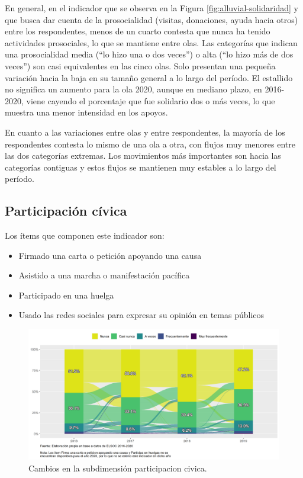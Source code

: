 \documentclass[
  12pt,
]{book}
\begin{document}
En general, en el indicador que se observa en la Figura \ref{fig:alluvial-solidaridad} y que busca dar cuenta de la prosocialidad (visitas, donaciones, ayuda hacia otros) entre los respondentes, menos de un cuarto contesta que nunca ha tenido actividades prosociales, lo que se mantiene entre olas. Las categorías que indican una prosocialidad media (``lo hizo una o dos veces'') o alta (``lo hizo más de dos veces'') son casi equivalentes en las cinco olas. Solo presentan una pequeña variación hacia la baja en su tamaño general a lo largo del período. El estallido no significa un aumento para la ola 2020, aunque en mediano plazo, en 2016-2020, viene cayendo el porcentaje que fue solidario dos o más veces, lo que muestra una menor intensidad en los apoyos.

En cuanto a las variaciones entre olas y entre respondentes, la mayoría de los respondentes contesta lo mismo de una ola a otra, con flujos muy menores entre las dos categorías extremas. Los movimientos más importantes son hacia las categorías contiguas y estos flujos se mantienen muy estables a lo largo del período.

\hypertarget{participaciuxf3n-cuxedvica}{%
\subsection{Participación cívica}\label{participaciuxf3n-cuxedvica}}

Los ítems que componen este indicador son:

\begin{itemize}
\item
  Firmado una carta o petición apoyando una causa
\item
  Asistido a una marcha o manifestación pacífica
\item
  Participado en una huelga
\item
  Usado las redes sociales para expresar su opinión en temas públicos
\end{itemize}

\begin{figure}[H]

{\centering \includegraphics[width=1\linewidth,height=1\textheight]{output/graphs/alluvial_participacion} 

}

\caption{Cambios en la subdimensión participacion civica.}\label{fig:alluvial-participacion}
\end{figure}
\end{document}
